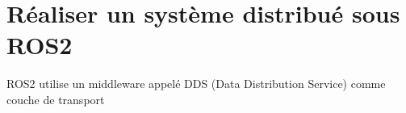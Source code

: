 \chapter{Réaliser un système distribué sous ROS2}

ROS2 utilise un middleware appelé DDS (Data Distribution Service) comme couche de transport